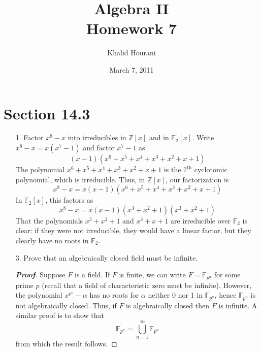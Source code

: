 \documentclass[12pt,leqno]{article}
\title{Algebra II\\\large Homework 7}
\date{March 7, 2011}
\author{Khalid Hourani}
\theoremstyle{definition}
\newcommand{\Z}{\mathbb{Z}}
\newcommand{\F}{\mathbb{F}}
\newcommand{\+}{\oplus}
\newenvironment{Proof}{\begin{proof}[\textnormal{\textbf{Proof}}]}{\end{proof}}
\begin{document}
 \begin{titlepage}
  \maketitle
 \end{titlepage}

\section*{Section 14.3}
  \begin{enumerate}
   \item [1.] Factor $x^8-x$ into irreducibles in $\Z[x]$ and in $\F_2[x]$.
    Write $x^8-x=x(x^7-1)$ and factor $x^7-1$ as \[(x-1)(x^6+x^5+x^4+x^3+x^2+x+1)\] The polynomial $x^6+x^5+x^4+x^3+x^2+x+1$ is the $7^{\text{th}}$ cyclotomic polynomial, which is irreducible. Thus, in $\Z[x]$, our factorization is \[x^8-x=x(x-1)(x^6+x^5+x^4+x^3+x^2+x+1)\] In $\F_2[x]$, this factors as \[x^8-x=x(x-1)(x^3+x^2+1)(x^3+x^2+1)\] That the polynomials $x^3+x^2+1$ and $x^3+x+1$ are irreducible over $\F_2$ is clear: if they were not irreducible, they would have a linear factor, but they clearly have no roots in $\F_2$.
   \item [3.] Prove that an algebraically closed field must be infinite.
    \begin{Proof}
     Suppose $F$ is a field. If $F$ is finite, we can write $F=\F_{p^n}$ for some prime $p$ (recall that a field of characteristic zero must be infinite). However, the polynomial $x^{p^n}-\alpha$ has no roots for $\alpha$ neither 0 nor 1 in $\F_{p^n}$, hence $\F_{p^n}$ is not algebraically closed. Thus, if $F$ is algebraically closed then $F$ is infinite. A similar proof is to show that \[\overline{\F_{p^n}}=\bigcup_{n=1}^{\infty}\F_{p^n}\] from which the result follows. 


\end{Proof}
\end{enumerate}
\end{document}
